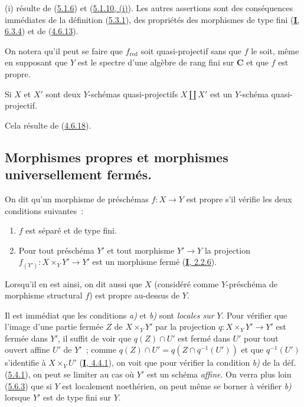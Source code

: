 (i) résulte de (\hyperref[II.5.1.6-fr]{5.1.6}) et
(\hyperref[II.5.1.10-fr]{5.1.10, (i)}). Les autres assertions sont des
conséquences immédiates de la définition (\hyperref[II.5.3.1-fr]{5.3.1}),
des propriétés des morphismes de type fini (\hyperref[I.6.3.4-fr]{\textbf{I}, 6.3.4})
et de (\hyperref[II.4.6.13-fr]{4.6.13}).

\begin{remark}[5.3.5]
\label{II.5.3.5-fr}
On notera qu'il peut se faire que $f_{\mathrm{red}}$ soit quasi-projectif
sans que $f$ le soit, même en supposant que $Y$ est le spectre d'une algèbre
de rang fini sur $\mathbf{C}$ et que $f$ est propre.
\end{remark}

\begin{corollary}[5.3.6]
\label{II.5.3.6-fr}
Si $X$ et $X'$ sont deux $Y$-schémas quasi-projectifs $X\amalg X'$ est un
$Y$-schéma quasi-projectif.
\end{corollary}

Cela résulte de (\hyperref[II.4.6.18-fr]{4.6.18}).

\subsection{Morphismes propres et morphismes universellement fermés.}
\label{subsection:II.5.4-fr}
\label{II.5.4-fr}

\begin{definition}[5.4.1]
\label{II.5.4.1-fr}
On dit qu'un morphisme de préschémas $f:X\to Y$ est propre s'il
vérifie les deux conditions suivantes~:
\begin{enumerate}
  \item[\rm{a)}] $f$ est séparé et de type fini.
  \item[\rm{b)}] Pour tout préschéma $Y'$ et tout morphisme $Y'\to Y$ la
  projection $f_{(Y')}:X\times_YY'\to Y'$ est un morphisme fermé
  (\hyperref[I.2.2.6-fr]{\textbf{I}, 2.2.6}).
\end{enumerate}
Lorsqu'il en est ainsi, on dit aussi que $X$ (considéré comme $Y$-préschéma
de morphisme structural $f$) est propre au-dessus de $Y$.
\end{definition}

Il est immédiat que les conditions \emph{a)} et \emph{b)} sont \emph{locales sur} $Y$. Pour
vérifier que l'image d'une partie fermée $Z$ de $X\times_YY'$ par la
projection $q:X\times_YY'\to Y'$ est fermée dans $Y'$, il suffit de voir que
$q(Z)\cap U'$ est fermé dans $U'$ pour tout ouvert affine $U'$ de $Y'$~;
comme $q(Z)\cap U'=q(Z\cap q^{-1}(U'))$ et que $q^{-1}(U')$ s'identifie à
$X\times_YU'$ (\hyperref[I.4.4.1-fr]{\textbf{I}, 4.4.1}), on voit que pour vérifier
la condition \emph{b)} de la déf. (\hyperref[II.5.4.1-fr]{5.4.1}), on peut se
limiter au cas où $Y'$ est un schéma \emph{affine}. On verra plus loin
(\hyperref[II.5.6.3-fr]{5.6.3}) que si $Y$ est localement noethérien, on
peut même se borner à vérifier \emph{b)} lorsque $Y'$ est de type fini sur $Y$.

